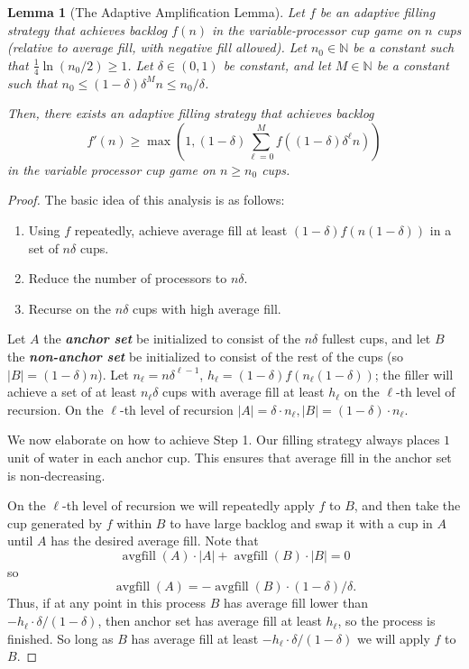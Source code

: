 \documentclass[twocolumn]{article}[11pt]
\newcommand{\defn}[1]{{\textit{\textbf{\boldmath #1}}}}
\DeclareMathOperator{\avgfil}{\text{avgfill}}
\newtheorem{lemma}{Lemma}
\begin{document}
\begin{lemma}[The Adaptive Amplification Lemma]\label{lem:adaptiveAmplification}
  Let $f$ be an adaptive filling strategy that achieves backlog $f(n)$ in the
  variable-processor cup game on $n$ cups (relative to average fill, with
  negative fill allowed).
  Let $n_0 \in \mathbb{N}$ be a constant such that $\frac{1}{4} \ln (n_0/2) \ge
  1$. Let $\delta\in(0,1)$ be constant, and let $M\in\mathbb{N}$ be a constant
  such that $n_0 \le (1-\delta)\delta^M n \le n_0/\delta$.

  Then, there exists an adaptive filling strategy that achieves backlog
  $$f'(n) \ge \max\left(1, (1-\delta)\sum_{\ell= 0}^{M} f((1-\delta)\delta^\ell n)\right)$$
  in the variable processor cup game on $n\ge n_0$ cups.
\end{lemma}
\begin{proof}
  The basic idea of this analysis is as follows:
  \begin{enumerate}
    \item Using $f$ repeatedly, achieve average fill at least $(1-\delta)
      f(n(1-\delta))$ in a set of $n\delta$ cups. 
    \item Reduce the number of processors to $n\delta$.
    \item Recurse on the $n\delta$ cups with high average fill.
  \end{enumerate}

  Let $A$ the \defn{anchor set} be initialized to consist of the $n\delta$
  fullest cups, and let $B$ the \defn{non-anchor set} be initialized to consist
  of the rest of the cups (so $|B| = (1-\delta)n$).
  Let $n_\ell = n\delta^{\ell-1}$, $h_\ell = (1-\delta)f(n_\ell(1-\delta))$;
  the filler will achieve a set of at least $n_\ell \delta$ cups with average
  fill at least $h_\ell$ on the $\ell$-th
  level of recursion. On the $\ell$-th level of recursion $|A| = \delta\cdot
  n_\ell, |B| = (1-\delta)\cdot n_\ell$.

  We now elaborate on how to achieve Step 1.
  Our filling strategy always places $1$ unit of water in each anchor cup. This
  ensures that average fill in the anchor set is non-decreasing.

  On the $\ell$-th level of recursion we will repeatedly apply $f$ to
  $B$, and then take the cup generated by $f$ within $B$ to have large backlog
  and swap it with a cup in $A$ until $A$ has the desired average fill. 
  Note that $$\avgfil(A) \cdot |A| +\avgfil(B)\cdot |B| = 0$$
  so $$\avgfil(A) = - \avgfil(B) \cdot (1-\delta)/ \delta.$$
  Thus, if at any point in this process $B$ has average fill lower than $-h_\ell
  \cdot \delta/(1-\delta)$,
  then anchor set has average fill at least $h_\ell$, so the process is
  finished. So long as $B$ has average fill at least $-h_\ell\cdot
  \delta/(1-\delta)$ we will apply $f$ to $B$.
  

\end{proof}
\end{document}
